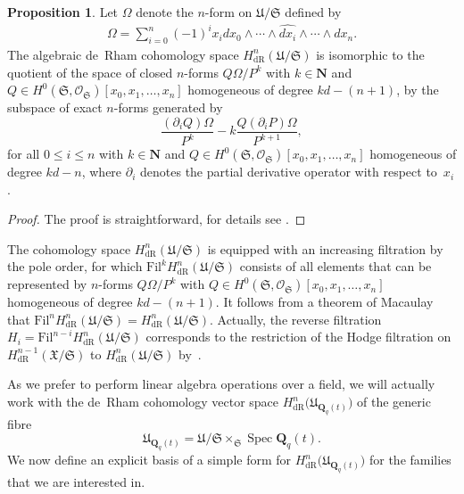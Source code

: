 \documentclass[a4paper,11pt]{article}
\numberwithin{equation}{section}
\newcommand{\NN}{\mathbf{N}} %
\newcommand{\QQ}{\mathbf{Q}} %
\DeclareMathOperator{\Spec}{Spec}        %
\providecommand{\HdR}{H_{\text{dR}}}    %
\theoremstyle{definition}
\newtheorem{prop}[thm]{Proposition}
\begin{document}
\begin{prop} \label{prop:Omega}
Let $\Omega$ denote the $n$-form on $\mathfrak{U}/\mathfrak{S}$ defined by 
\begin{align*}
\Omega = \sum_{i=0}^n (-1)^i x_i d x_0 \wedge \dotsb \wedge \widehat{d x_i} \wedge \dotsb \wedge d x_n.
\end{align*}
The algebraic de~Rham cohomology space $\HdR^{n}(\mathfrak{U}/\mathfrak{S})$ 
is isomorphic to the quotient of the space of closed $n$-forms 
$Q \Omega / P^k$ with $k \in \NN$ and 
$Q \in H^0(\mathfrak{S},\mathcal{O}_{\mathfrak{S}})[x_0, x_1, \dotsc, x_n]$ 
homogeneous of degree $k d - (n + 1)$, by the subspace of exact $n$-forms 
generated by
\begin{equation*} 
\frac{(\partial_i Q) \Omega}{P^k} - k \frac{Q (\partial_i P) \Omega}{P^{k+1}},
\end{equation*}
for all $0 \leq i \leq n$ with $k \in \NN$ and 
$Q \in H^0(\mathfrak{S}, \mathcal{O}_{\mathfrak{S}})[x_0, x_1, \dotsc, x_n]$ 
homogeneous of degree $kd-n$, where $\partial_i$ denotes the partial 
derivative operator with respect to~$x_i$.
\end{prop}

\begin{proof}
The proof is straightforward, for details see \citep[\S 4]{Griffiths1969}.
\end{proof}

The cohomology space $\HdR^{n}(\mathfrak{U}/\mathfrak{S})$ is 
equipped with an increasing filtration by the pole order, for which 
$\mbox{Fil}^k \HdR^{n}(\mathfrak{U}/\mathfrak{S})$ consists of all elements 
that can be represented by $n$-forms $Q \Omega / P^k$ with 
$Q \in H^0(\mathfrak{S},\mathcal{O}_{\mathfrak{S}})[x_0, x_1, \dotsc, x_n]$ 
homogeneous of degree $kd - (n + 1)$.  It follows from a theorem of 
Macaulay~\citep[(4.11)]{Griffiths1969} that 
$\mbox{Fil}^n \HdR^{n}(\mathfrak{U}/\mathfrak{S}) = \HdR^{n}(\mathfrak{U}/\mathfrak{S})$. 
Actually, the reverse filtration $H_i=\mbox{Fil}^{n-i} \HdR^{n}(\mathfrak{U}/\mathfrak{S})$
corresponds to the restriction of the Hodge filtration on 
$\HdR^{n-1}(\mathfrak{X}/\mathfrak{S})$ to $\HdR^{n}(\mathfrak{U}/\mathfrak{S})$ 
by~\citep[(8.6.)]{Griffiths1969}.

As we prefer to perform linear 
algebra operations over a field, we will actually work with the de~Rham 
cohomology vector space $\HdR^{n}\bigl(\mathfrak{U}_{\QQ_q(t)}\bigr)$ of 
the generic fibre 
\[
\mathfrak{U}_{\QQ_q(t)} = \mathfrak{U}/\mathfrak{S} \times_{\mathfrak{S}} \Spec \QQ_q(t).
\] 
We now define an explicit basis of a simple form for 
$\HdR^{n}\bigl(\mathfrak{U}_{\QQ_q(t)}\bigr)$ 
for the families that we are interested in.
\end{document}
